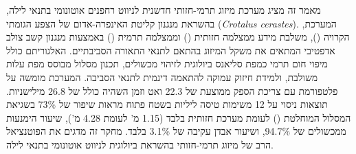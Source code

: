 

מאמר זה מציג מערכת מיזוג תרמי-חזותי חדשנית לניווט רחפנים אוטונומי בתנאי לילה, בהשראת מנגנון קליטת האינפרה-אדום של הצפע הגומתי (\emph{Crotalus cerastes}). המערכת, הקרויה  (), משלבת מידע ממצלמה חזותית () וממצלמה תרמית () באמצעות מנגנון קשב צולב אדפטיבי המתאים את משקל המיזוג בהתאם לתנאי התאורה הסביבתיים. האלגוריתם כולל מיפוי חום תרמי כמפת סליאנס ביולוגית לזיהוי מכשולים, תכנון מסלול מבוסס מפת עלות משולבת, ולמידת חיזוק עמוקה להתאמה דינמית לתנאי הסביבה. המערכת מומשה על פלטפורמת  עם צריכת הספק ממוצעת של 22.3 ואט וזמן השהיה כולל של 26.8 מילישניות. תוצאות ניסוי על 12 משימות טיסה ליליות בשטח פתוח מראות שיפור של 73\% בשגיאת המסלול המוחלטת () לעומת מערכת  חזותית בלבד (1.15 מ' לעומת 4.28 מ'), שיעור הימנעות ממכשולים של 94.7\%, ושיעור אבדן עקיבה של 3.1\% בלבד. מחקר זה מדגים את הפוטנציאל הרב של מיזוג תרמי-חזותי בהשראת ביולוגית לניווט אוטונומי בתנאי לילה.
